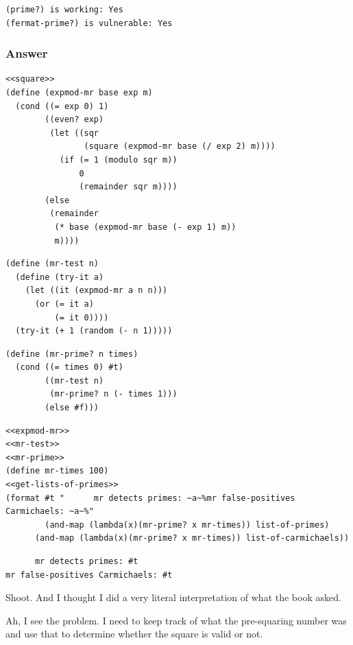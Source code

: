 \documentclass[final,fleqn,titlepage,twoside]{article}
\begin{document}
\begin{verbatim}
(prime?) is working: Yes
(fermat-prime?) is vulnerable: Yes
\end{verbatim}

\subsubsection{Answer}
\label{sec:org3da674d}
\begin{verbatim}
<<square>>
(define (expmod-mr base exp m)
  (cond ((= exp 0) 1)
        ((even? exp)
         (let ((sqr
                (square (expmod-mr base (/ exp 2) m))))
           (if (= 1 (modulo sqr m))
               0
               (remainder sqr m))))
        (else
         (remainder 
          (* base (expmod-mr base (- exp 1) m))
          m))))
\end{verbatim}
\begin{verbatim}
(define (mr-test n)
  (define (try-it a)
    (let ((it (expmod-mr a n n)))
      (or (= it a)
          (= it 0))))
  (try-it (+ 1 (random (- n 1)))))
\end{verbatim}
\begin{verbatim}
(define (mr-prime? n times)
  (cond ((= times 0) #t)
        ((mr-test n) 
         (mr-prime? n (- times 1)))
        (else #f)))
\end{verbatim}

\begin{verbatim}
<<expmod-mr>>
<<mr-test>>
<<mr-prime>>
(define mr-times 100)
<<get-lists-of-primes>>
(format #t "      mr detects primes: ~a~%mr false-positives Carmichaels: ~a~%"
        (and-map (lambda(x)(mr-prime? x mr-times)) list-of-primes)
      (and-map (lambda(x)(mr-prime? x mr-times)) list-of-carmichaels))
\end{verbatim}

\begin{verbatim}
      mr detects primes: #t
mr false-positives Carmichaels: #t
\end{verbatim}

Shoot. And I thought I did a very literal interpretation of what the book asked.

Ah, I see the problem. I need to keep track of what the pre-squaring number was
and use that to determine whether the square is valid or not.
\end{document}
